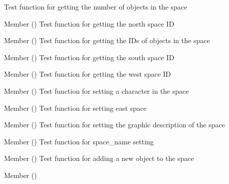 \begin{DoxyRefList}
%
Test function for getting the number of objects in the space  
\item[Member \doxylink{space__test_8h_a3a87f1e1e173d622bfbd3bcd14e060ca}{test1\+\_\+space\+\_\+get\+\_\+north} ()]\label{test__test000141}%
%
Test function for getting the north space ID  
\item[Member \doxylink{space__test_8h_a18bcac31a593c52dd91b37ce5ad8147e}{test1\+\_\+space\+\_\+get\+\_\+objects\+\_\+ids} ()]\label{test__test000151}%
%
Test function for getting the IDs of objects in the space  
\item[Member \doxylink{space__test_8h_a8e345065f58565e131bdb3a9d0096ed5}{test1\+\_\+space\+\_\+get\+\_\+south} ()]\label{test__test000143}%
%
Test function for getting the south space ID  
\item[Member \doxylink{space__test_8h_a1f08c6866885bfc093717f57b1b86539}{test1\+\_\+space\+\_\+get\+\_\+west} ()]\label{test__test000147}%
%
Test function for getting the west space ID  
\item[Member \doxylink{space__test_8h_aa1e97468c10eeaf41307bee977142506}{test1\+\_\+space\+\_\+set\+\_\+character} ()]\label{test__test000133}%
%
Test function for setting a character in the space  
\item[Member \doxylink{space__test_8h_ab1f093af4be3ca8e525d0517cc846f47}{test1\+\_\+space\+\_\+set\+\_\+east} ()]\label{test__test000127}%
%
Test function for setting east space  
\item[Member \doxylink{space__test_8h_a068c22b91236896ae1b077a8f7059458}{test1\+\_\+space\+\_\+set\+\_\+gdesc} ()]\label{test__test000135}%
%
Test function for setting the graphic description of the space  
\item[Member \doxylink{space__test_8h_a2569bab6cfeec15f722d232bb8c78c9e}{test1\+\_\+space\+\_\+set\+\_\+name} ()]\label{test__test000120}%
%
Test function for space\+\_\+name setting  
\item[Member \doxylink{space__test_8h_a7c86199a83737e9600e279709d08b7a6}{test1\+\_\+space\+\_\+set\+\_\+new\+\_\+object} ()]\label{test__test000131}%
%
Test function for adding a new object to the space  
\item[Member \doxylink{space__test_8h_a3d3457a89f705948102cf1e5d4a7b45b}{test1\+\_\+space\+\_\+set\+\_\+north} ()]\label{test__test000123}%

\end{DoxyRefList}

